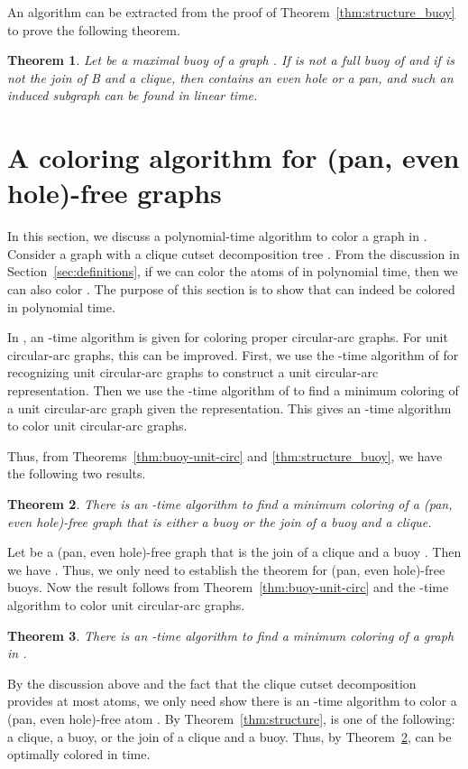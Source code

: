 \documentclass[11pt,a4paper]{article}
\newtheorem{theorem} {Theorem}[section]
\newenvironment{proof}{\noindent {\it Proof:~}}{\hfill \smallskip\par}
\begin{document}
An algorithm can be extracted from the proof of
Theorem~\ref{thm:structure_buoy} to prove the following theorem.
\begin{theorem}\label{thm:find-structure-buoy}
Let  be a maximal buoy of a graph . If  is not a full buoy of  and
if  is not the join of B and a clique, then  contains an even hole or a pan,
and such an induced subgraph can be found in linear time. \hfill 
\end{theorem}

\section{A coloring algorithm for (pan, even hole)-free graphs}
\label{sec:coloring}
In this section, we discuss a polynomial-time algorithm to color a
graph in . Consider a graph   with a clique cutset
decomposition tree . From the discussion in
Section~\ref{sec:definitions}, if we can color the atoms of  in
polynomial time, then we can also color . The purpose of this
section is to show that  can indeed be colored in polynomial
time.

In \cite{OrlBon1991}, an -time algorithm is given for coloring
proper circular-arc graphs. For unit circular-arc graphs, this can be improved.
First, we use the -time algorithm of \cite{LS2008} for recognizing unit circular-arc
graphs to construct a unit circular-arc representation. Then we use the -time
algorithm of \cite{ShihHsu} to find a minimum coloring of a unit circular-arc graph
given the representation.  This gives an -time algorithm to color unit
circular-arc graphs.

Thus, from
Theorems~\ref{thm:buoy-unit-circ} and \ref{thm:structure_buoy}, we have the following two results.
\begin{theorem}\label{thm:color-join}
There is an -time algorithm to find a minimum coloring of
a (pan, even hole)-free graph that is either a buoy or the join of  a buoy and a clique.
\end{theorem}
\begin{proof}
Let  be a (pan, even hole)-free graph that is the join of a
clique  and a buoy . Then we have .
Thus, we only need to establish the theorem for (pan, even
hole)-free buoys. Now the result follows from
Theorem~\ref{thm:buoy-unit-circ} and the -time
algorithm to color unit circular-arc graphs.
\end{proof}

\begin{theorem}\label{thm:color-main}
There is an -time algorithm to find a minimum coloring of
a graph in .
\end{theorem}
\begin{proof}
By the discussion above and the fact that the clique cutset
decomposition provides at most  atoms, we only need show
there is an -time algorithm to color a  (pan, even
hole)-free atom . By Theorem~\ref{thm:structure},  is one of
the following: a clique, a buoy, or the join of a clique and a
buoy. Thus, by Theorem~\ref{thm:color-join},  can be optimally
colored in  time.
\end{proof}
\end{document}
